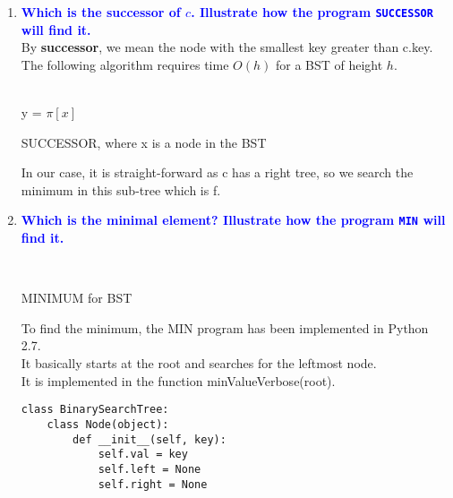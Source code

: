 \documentclass[11pt]{article}
\begin{document}
\begin{enumerate}
    \begin{enumerate}
    \item \textbf{\textcolor{blue}{Which is the successor of $c$. Illustrate how the program {\tt SUCCESSOR} will find it.}}
        \\ By \textbf{successor}, we mean the node with the smallest key greater than c.key.
        \\ The following algorithm requires time $O(h)$ for a BST of height $h$. \\
        \begin{algorithm}[H]
        \Indm{} \\
        \Indp
            y = $\pi[x]$ \\
        \caption{SUCCESSOR, where x is a node in the BST}  
        \end{algorithm}
        In our case, it is straight-forward as c has a right tree, so we search the minimum in this sub-tree which is f.
        
    \item \textbf{\textcolor{blue}{Which is the minimal element? Illustrate how the program {\tt MIN} will find it.}}
        \begin{algorithm}[H]
        \Indm{} \\
        \Indp
        \caption{MINIMUM for BST}  
        \end{algorithm}
        To find the minimum, the MIN program has been implemented in Python 2.7.
        \\ It basically starts at the root and searches for the leftmost node.
        \\ It is implemented in the function minValueVerbose(root).
        \begin{verbatim}
class BinarySearchTree:
    class Node(object):
        def __init__(self, key):
            self.val = key
            self.left = None
            self.right = None
        

\end{verbatim}
\end{enumerate}
\end{enumerate}
\end{document}
